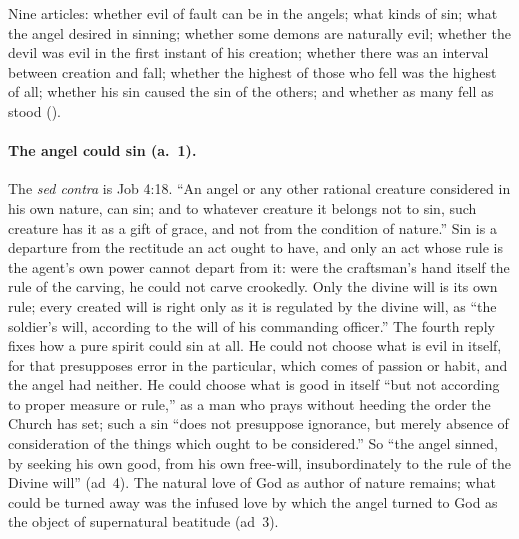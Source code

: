 Nine articles: whether evil of fault can be in the angels; what kinds
of sin; what the angel desired in sinning; whether some demons are
naturally evil; whether the devil was evil in the first instant of his
creation; whether there was an interval between creation and fall;
whether the highest of those who fell was the highest of all; whether
his sin caused the sin of the others; and whether as many fell as stood
().

\paragraph{The angel could sin (a.~1).} The \emph{sed contra} is Job
4:18. ``An angel or any other rational creature considered in his own
nature, can sin; and to whatever creature it belongs not to sin, such
creature has it as a gift of grace, and not from the condition of
nature.'' Sin is a departure from the rectitude an act ought to have,
and only an act whose rule is the agent's own power cannot depart from
it: were the craftsman's hand itself the rule of the carving, he could
not carve crookedly. Only the divine will is its own rule; every created
will is right only as it is regulated by the divine will, as ``the
soldier's will, according to the will of his commanding officer.'' The
fourth reply fixes how a pure spirit could sin at all. He could not
choose what is evil in itself, for that presupposes error in the
particular, which comes of passion or habit, and the angel had neither.
He could choose what is good in itself ``but not according to proper
measure or rule,'' as a man who prays without heeding the order the
Church has set; such a sin ``does not presuppose ignorance, but merely
absence of consideration of the things which ought to be considered.''
So ``the angel sinned, by seeking his own good, from his own free-will,
insubordinately to the rule of the Divine will'' (ad~4). The natural
love of God as author of nature remains; what could be turned away was
the infused love by which the angel turned to God as the object of
supernatural beatitude (ad~3).

